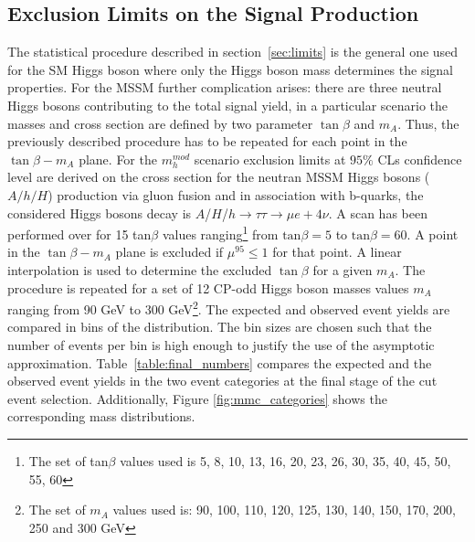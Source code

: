 \subsection{Exclusion Limits on the Signal Production}
The statistical procedure described in section~\ref{sec:limits} is  the general one used for the SM Higgs
boson where only the Higgs boson mass determines the signal properties. For the MSSM further complication
arises:  there are three neutral Higgs bosons contributing to the total signal yield,
in a particular scenario the masses and cross section are defined 
by two parameter $\tan \beta$ and $m_A$. Thus, the previously described procedure
 has to be repeated for each point in the $\tan \beta - m_A$ plane. 
For the $m_h^{mod}$ scenario exclusion limits at $95\%$ CLs confidence level 
are derived on the cross section for the neutran MSSM Higgs bosons ($A/h/H$) production via gluon fusion and in association
with b-quarks,  the considered Higgs bosons decay is $A$/$H$/$h\to\tau\tau\to \mu e + 4\nu$. 
A scan has been performed over for 15 tan$\beta$ values ranging\footnote{
			The set of  tan$\beta$ values used
			is 5, 8, 10, 13, 16, 20, 23, 26, 30, 35, 40, 45, 50, 55, 60}  
from $\mathrm{tan}\beta=5$ to $\mathrm{tan}\beta=60$.
A point in the  $\tan \beta - m_A$ plane is excluded if $\mu^{95} \leq 1$ for that point.
A linear interpolation is used to determine the excluded $\tan \beta$ for a given $m_A$.
The procedure is repeated for a set of 12 CP-odd Higgs boson masses values $m_A$ ranging from 90 GeV 
to 300 GeV\footnote{ The set of $m_A$ values used is: 90, 100, 110, 120, 125, 130,
			140, 150, 170, 200, 250 and 300 GeV}.
The expected and observed event yields are compared in bins of the \mmc distribution. The bin sizes are
 chosen such that the number of events per bin is high enough to justify the use of the 
asymptotic approximation.
Table~\ref{table:final_numbers} compares the expected and the observed event yields in 
 the two event categories at the final
stage of the cut event selection. Additionally, Figure \ref{fig:mmc_categories} shows the corresponding 
\mmc mass distributions.


